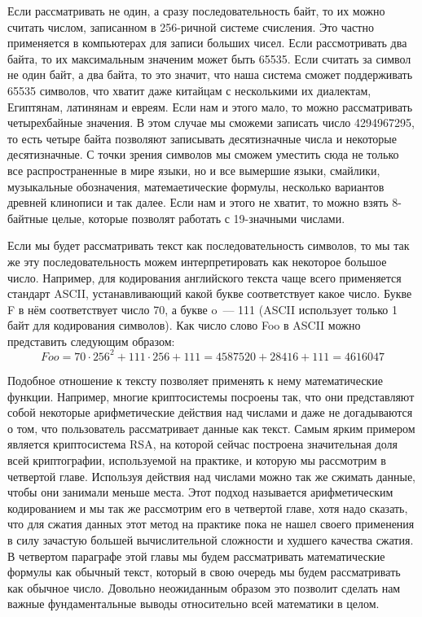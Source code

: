 Если рассматривать не один, а сразу последовательность байт, то их можно считать числом, записанном в 256-ричной системе счисления. Это частно применяется в компьютерах для записи больших чисел. Если рассмотривать два байта, то их максимальным значеним может быть 65535. Если считать за символ не один байт, а два байта, то это значит, что наша система сможет поддерживать 65535 символов, что хватит даже китайцам с несколькими их диалектам, Египтянам, латинянам и евреям. Если нам и этого мало, то можно рассматривать четырехбайные значения. В этом случае мы сможеми записать число 4294967295, то есть четыре байта позволяют записывать десятизначные числа и некоторые десятизначные. С точки зрения символов мы сможем уместить сюда не только все распространенные в мире языки, но и все вымершие языки, смайлики, музыкальные обозначения, матемаетические формулы, несколько вариантов древней клинописи и так далее. Если нам и этого не хватит, то можно взять 8-байтные целые, которые позволят работать с 19-значными числами.

Если мы будет рассматривать текст как последовательность символов, то мы так же эту последовательность можем интерпретировать как некоторое большое число. Например, для кодирования английского текста чаще всего применяется стандарт ASCII, устанавливающий какой букве соответствует какое число. Букве F в нём соответствует число 70, а букве o~--- 111 (ASCII использует только 1 байт для кодирования символов). Как число слово Foo в ASCII можно представить следующим образом:
$$Foo = 70 \cdot 256^2 + 111 \cdot 256 + 111 = 4587520 + 28416 + 111 = 4616047$$

Подобное отношение к тексту позволяет применять к нему математические функции. Например, многие криптосистемы посроены так, что они представляют собой некоторые арифметические действия над числами и даже не догадываются о том, что пользователь рассматривает данные как текст. Самым ярким примером является криптосистема RSA, на которой сейчас построена значительная доля всей криптографии, используемой на практике, и которую мы рассмотрим в четвертой главе. Используя действия над числами можно так же сжимать данные, чтобы они занимали меньше места. Этот подход называется арифметическим кодированием и мы так же рассмотрим его в четвертой главе, хотя надо сказать, что для сжатия данных этот метод на практике пока не нашел своего применения в силу зачастую большей вычислительной сложности и худшего качества сжатия. В четвертом параграфе этой главы мы будем рассматривать математические формулы как обычный текст, который в свою очередь мы будем рассматривать как обычное число. Довольно неожиданным образом это позволит сделать нам важные фундаментальные выводы относительно всей математики в целом.

